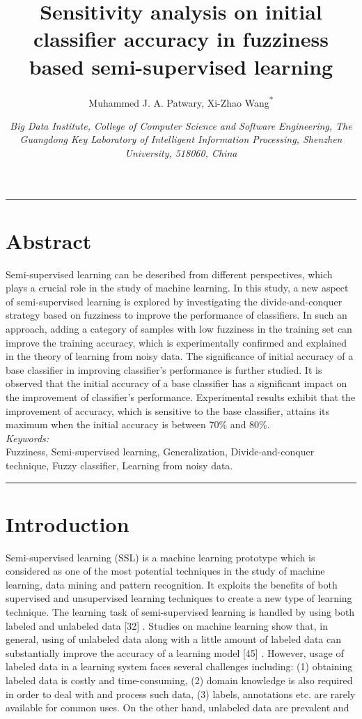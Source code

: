 \documentclass{article}
\title{Sensitivity analysis on initial classifier accuracy in fuzziness based
	semi-supervised learning}
\author{Muhammed J. A. Patwary, Xi-Zhao Wang\textsuperscript{*}}
\date{\small \textit{Big Data Institute, College of Computer Science and Software Engineering, The Guangdong Key Laboratory of Intelligent
		Information Processing, Shenzhen University, 518060, China}}
\begin{document}
	\maketitle
	\vspace{1em} %
	\hrule
	
	\section*{Abstract}
	Semi-supervised learning can be described from different perspectives, which plays a crucial role in the study
	of machine learning. In this study, a new aspect of semi-supervised learning is explored by investigating
	the divide-and-conquer strategy based on fuzziness to improve the performance of classifiers. In such an
	approach, adding a category of samples with low fuzziness in the training set can improve the training
	accuracy, which is experimentally confirmed and explained in the theory of learning from noisy data. The
	significance of initial accuracy of a base classifier in improving classifier’s performance is further studied.
	It is observed that the initial accuracy of a base classifier has a significant impact on the improvement of
	classifier’s performance. Experimental results exhibit that the improvement of accuracy, which is sensitive
	to the base classifier, attains its maximum when the initial accuracy is between 70\% and 80\%.\\
	\textit{Keywords:}\\
	Fuzziness, Semi-supervised learning, Generalization, Divide-and-conquer technique, Fuzzy classifier,
	Learning from noisy data.
	
	\vspace{1em}
	\hrule
	\section{Introduction}
	\hspace{1cm} Semi-supervised learning (SSL) is a machine learning prototype which is considered as one of the most
	potential techniques in the study of machine learning, data mining and pattern recognition. It exploits the
	benefits of both supervised and unsupervised learning techniques to create a new type of learning technique.
	The learning task of semi-supervised learning is handled by using both labeled and unlabeled data [32] \cite{zhang1998fuzziness} . 
	Studies on machine learning show that, in general, using of unlabeled data along with a little amount of
	labeled data can substantially improve the accuracy of a learning model [45] \cite{fuxreiter2018fuzziness}. However, usage of labeled
	data in a learning system faces several challenges including: (1) obtaining labeled data is costly and time-consuming, (2) domain knowledge is also required in order to deal with and process such data, (3) labels,
	annotations etc. are rarely available for common uses. On the other hand, unlabeled data are prevalent and
	\vspace{0.5em}
	
\end{document}
